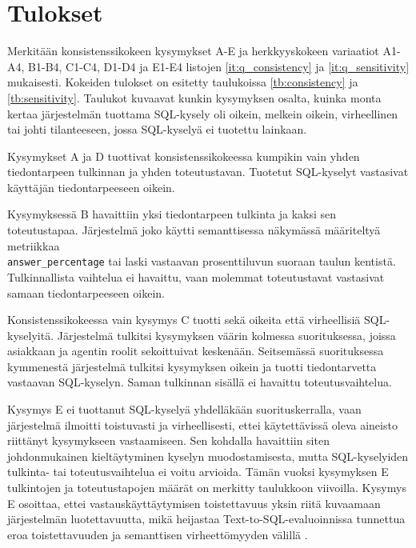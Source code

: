 \section{Tulokset}\label{sec:results}
Merkitään konsistenssikokeen kysymykset A-E ja herkkyyskokeen variaatiot A1-A4, B1-B4, C1-C4, D1-D4 ja E1-E4 listojen \ref{it:q_consistency} ja \ref{it:q_sensitivity} mukaisesti. Kokeiden tulokset on esitetty taulukoissa \ref{tb:consistency} ja \ref{tb:sensitivity}. Taulukot kuvaavat kunkin kysymyksen osalta, kuinka monta kertaa järjestelmän tuottama SQL-kysely oli oikein, melkein oikein, virheellinen tai johti tilanteeseen, jossa SQL-kyselyä ei tuotettu lainkaan.

Kysymykset A ja D tuottivat konsistenssikokeessa kumpikin vain yhden
tiedontarpeen tulkinnan ja yhden toteutustavan. Tuotetut SQL-kyselyt
vastasivat käyttäjän tiedontarpeeseen oikein.

Kysymyksessä B havaittiin yksi tiedontarpeen tulkinta ja kaksi sen
toteutustapaa. Järjestelmä joko käytti semanttisessa näkymässä
määriteltyä metriikkaa \\ \texttt{answer\_percentage} tai laski vastaavan
prosenttiluvun suoraan taulun kentistä. Tulkinnallista vaihtelua ei
havaittu, vaan molemmat toteutustavat vastasivat samaan tiedontarpeeseen
oikein.

Konsistenssikokeessa vain kysymys C tuotti sekä oikeita että virheellisiä
SQL-kyselyitä. Järjestelmä tulkitsi kysymyksen väärin kolmessa
suorituksessa, joissa asiakkaan ja agentin roolit sekoittuivat
keskenään. Seitsemässä suorituksessa kymmenestä järjestelmä tulkitsi
kysymyksen oikein ja tuotti tiedontarvetta vastaavan SQL-kyselyn.
Saman tulkinnan sisällä ei havaittu toteutusvaihtelua.

Kysymys E ei tuottanut SQL-kyselyä yhdelläkään
suorituskerralla, vaan järjestelmä ilmoitti toistuvasti ja virheellisesti,
ettei käytettävissä oleva aineisto riittänyt kysymykseen vastaamiseen.
Sen kohdalla havaittiin siten johdonmukainen kieltäytyminen kyselyn
muodostamisesta, mutta SQL-kyselyiden tulkinta- tai toteutusvaihtelua
ei voitu arvioida. Tämän vuoksi kysymyksen E tulkintojen ja
toteutustapojen määrät on merkitty taulukkoon viivoilla. Kysymys E
osoittaa, ettei vastauskäyttäytymisen toistettavuus yksin riitä
kuvaamaan järjestelmän luotettavuutta, mikä heijastaa
Text-to-SQL-evaluoinnissa tunnettua eroa toistettavuuden ja semanttisen
virheettömyyden välillä \cite{pourreza2024etm}.

